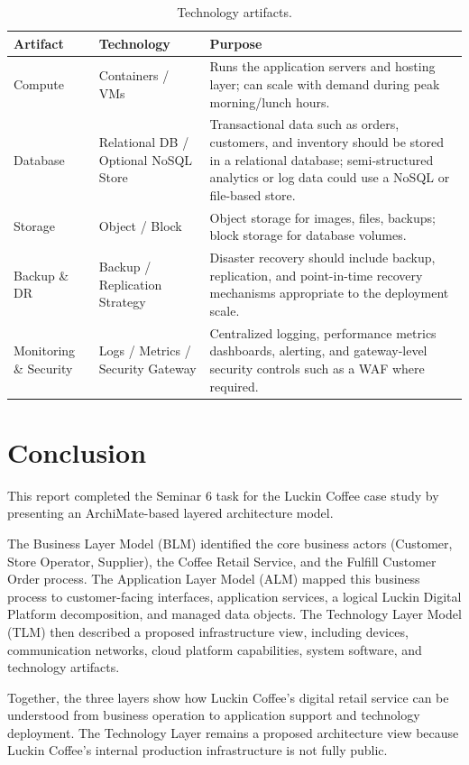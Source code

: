 \documentclass[12pt,a4paper]{article}
\begin{document}
\begin{table}[H]
\centering
\caption{Technology artifacts.}
\small
\begin{tabularx}{\textwidth}{P{3.8cm}P{3.8cm}Y}
\toprule
\textbf{Artifact} & \textbf{Technology} & \textbf{Purpose} \\
\midrule
Compute & Containers / VMs & Runs the application servers and hosting layer; can scale with demand during peak morning/lunch hours. \\
Database & Relational DB / Optional NoSQL Store & Transactional data such as orders, customers, and inventory should be stored in a relational database; semi-structured analytics or log data could use a NoSQL or file-based store. \\
Storage & Object / Block & Object storage for images, files, backups; block storage for database volumes. \\
Backup \& DR & Backup / Replication Strategy & Disaster recovery should include backup, replication, and point-in-time recovery mechanisms appropriate to the deployment scale. \\
Monitoring \& Security & Logs / Metrics / Security Gateway & Centralized logging, performance metrics dashboards, alerting, and gateway-level security controls such as a WAF where required. \\
\bottomrule
\end{tabularx}
\end{table}

\section{Conclusion}

This report completed the Seminar 6 task for the Luckin Coffee case study by presenting an ArchiMate-based layered architecture model.

The Business Layer Model (BLM) identified the core business actors (Customer, Store Operator, Supplier), the Coffee Retail Service, and the Fulfill Customer Order process. The Application Layer Model (ALM) mapped this business process to customer-facing interfaces, application services, a logical Luckin Digital Platform decomposition, and managed data objects. The Technology Layer Model (TLM) then described a proposed infrastructure view, including devices, communication networks, cloud platform capabilities, system software, and technology artifacts.

Together, the three layers show how Luckin Coffee's digital retail service can be understood from business operation to application support and technology deployment. The Technology Layer remains a proposed architecture view because Luckin Coffee's internal production infrastructure is not fully public.
\end{document}
